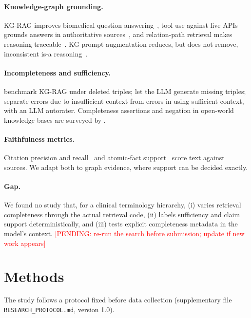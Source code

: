 \documentclass[11pt]{article}
\newcommand{\pending}[1]{\textcolor{red}{[PENDING: #1]}}
\begin{document}
\paragraph{Knowledge-graph grounding.} KG-RAG improves biomedical question answering~\citep{soman2024kgrag,xiong2024medrag}, tool use against live APIs grounds answers in authoritative sources~\citep{jin2024genegpt,frei2025infherno}, and relation-path retrieval makes reasoning traceable~\citep{luo2024rog}. KG prompt augmentation reduces, but does not remove, inconsistent is-a reasoning~\citep{ucedasosa2024concepts}.

\paragraph{Incompleteness and sufficiency.} \citet{zhou2026brink} benchmark KG-RAG under deleted triples; \citet{xu2024gog} let the LLM generate missing triples; \citet{joren2025sufficient} separate errors due to insufficient context from errors in using sufficient context, with an LLM autorater. Completeness assertions and negation in open-world knowledge bases are surveyed by \citet{razniewski2024completeness}.

\paragraph{Faithfulness metrics.} Citation precision and recall~\citep{gao2023alce} and atomic-fact support~\citep{min2023factscore} score text against sources. We adapt both to graph evidence, where support can be decided exactly.

\paragraph{Gap.} We found no study that, for a clinical terminology hierarchy, (i) varies retrieval completeness through the actual retrieval code, (ii) labels sufficiency and claim support deterministically, and (iii) tests explicit completeness metadata in the model's context. \pending{re-run the search before submission; update if new work appears}

\section{Methods}

The study follows a protocol fixed before data collection (supplementary file \texttt{RESEARCH\_PROTOCOL.md}, version 1.0).
\end{document}
